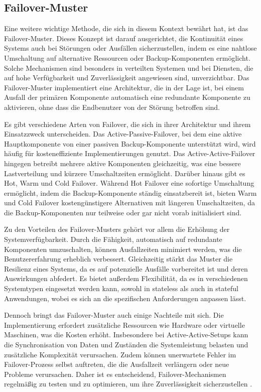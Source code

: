 \subsection{Failover-Muster}
Eine weitere wichtige Methode, die sich in diesem Kontext bewährt hat, ist das
Failover-Muster. Dieses Konzept ist darauf ausgerichtet, die Kontinuität eines
Systems auch bei Störungen oder Ausfällen sicherzustellen, indem es eine
nahtlose Umschaltung auf alternative Ressourcen oder Backup-Komponenten
ermöglicht. Solche Mechanismen sind besonders in verteilten Systemen und bei
Diensten, die auf hohe Verfügbarkeit und Zuverlässigkeit angewiesen sind,
unverzichtbar. Das Failover-Muster implementiert eine Architektur, die in der Lage
ist, bei einem Ausfall der primären Komponente automatisch eine redundante
Komponente zu aktivieren, ohne dass die Endbenutzer von der Störung betroffen
sind.

Es gibt verschiedene Arten von Failover, die sich in ihrer Architektur und ihrem
Einsatzzweck unterscheiden. Das Active-Passive-Failover, bei dem eine aktive
Hauptkomponente von einer passiven Backup-Komponente unterstützt wird, wird
häufig für kosteneffiziente Implementierungen genutzt. Das Active-Active-Failover
hingegen betreibt mehrere aktive Komponenten gleichzeitig, was eine bessere
Lastverteilung und kürzere Umschaltzeiten ermöglicht. Darüber hinaus gibt es
Hot, Warm und Cold Failover. Während Hot Failover eine sofortige Umschaltung
ermöglicht, indem die Backup-Komponente ständig einsatzbereit ist, bieten Warm
und Cold Failover kostengünstigere Alternativen mit längeren Umschaltzeiten, da
die Backup-Komponenten nur teilweise oder gar nicht vorab initialisiert sind.

Zu den Vorteilen des Failover-Musters gehört vor allem die Erhöhung der
Systemverfügbarkeit. Durch die Fähigkeit, automatisch auf redundante
Komponenten umzuschalten, können Ausfallzeiten minimiert werden, was die
Benutzererfahrung erheblich verbessert. Gleichzeitig stärkt das Muster die
Resilienz eines Systems, da es auf potenzielle Ausfälle vorbereitet ist und deren
Auswirkungen abfedert. Es bietet außerdem Flexibilität, da es in verschiedenen Systemtypen eingesetzt werden kann, sowohl in stateless als auch in stateful
Anwendungen, wobei es sich an die spezifischen Anforderungen anpassen lässt.

Dennoch bringt das Failover-Muster auch einige Nachteile mit sich. Die Implementierung erfordert zusätzliche Ressourcen wie Hardware oder virtuelle
Maschinen, was die Kosten erhöht. Insbesondere bei Active-Active-Setups kann
die Synchronisation von Daten und Zuständen die Systemleistung belasten und
zusätzliche Komplexität verursachen. Zudem können unerwartete Fehler im
Failover-Prozess selbst auftreten, die die Ausfallzeit verlängern oder neue
Probleme verursachen. Daher ist es entscheidend, Failover-Mechanismen
regelmäßig zu testen und zu optimieren, um ihre Zuverlässigkeit sicherzustellen \cite{failover-patterns}.